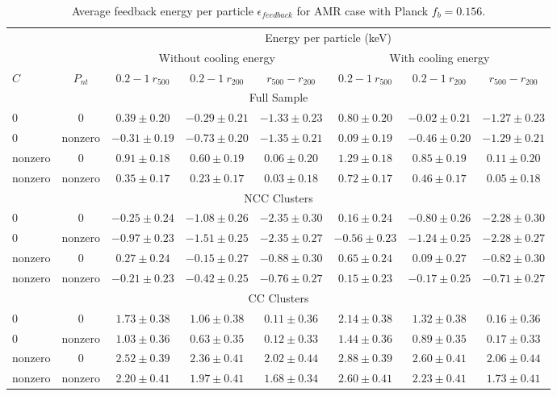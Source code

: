 \documentclass[a4paper,fleqn,usenatbib]{mnras}
\begin{document}
\begin{table*}
 \caption{Average feedback energy per particle $\epsilon_{feedback}$ for AMR case with Planck $f_{b}=0.156$.}
 \label{amrplanck}
 \begin{tabular}{@{}lccccccc}
  \hline
 &&\multicolumn{6}{c}{Energy per particle (keV) }\\
    \cline{3-8}
&&\multicolumn{3}{c}{Without cooling energy}&\multicolumn{3}{c}{With cooling energy}\\
\cline{3-8}
 $C$    &$P_{nt}$   & $0.2-1~r_{500}$ &   $0.2-1~r_{200}$& $r_{500}-r_{200}$&   $0.2-1~r_{500}$&$0.2-1~r_{200}$&$r_{500}-r_{200}$\\
  \hline
\multicolumn{8}{c}{Full Sample}\\
\hline
 0            &0          &$0.39\pm0.20$    &$-0.29\pm0.21$  &  $-1.33\pm0.23$  & $0.80\pm0.20$     &$-0.02\pm0.21$   & $-1.27\pm0.23$    \\
 0            & nonzero   & $-0.31\pm0.19$  &$-0.73\pm0.20$  &  $-1.35\pm0.21$  & $ 0.09\pm0.19$      &$-0.46\pm0.20$   &  $-1.29\pm0.21$     \\
nonzero       & 0         &$0.91\pm0.18$    &$0.60\pm0.19$  &  $0.06\pm0.20$  & $ 1.29\pm0.18$     &$0.85\pm0.19$   & $ 0.11\pm0.20$     \\
nonzero       & nonzero   & $ 0.35\pm0.17$  &$0.23\pm0.17$  &  $0.03\pm0.18$  & $0.72\pm0.17$      &$0.46\pm0.17$   &  $ 0.05\pm0.18$    \\
  \hline 
\multicolumn{8}{c}{NCC Clusters}\\
\hline
 0       &0          &$-0.25\pm0.24$    & $-1.08\pm0.26$  &  $-2.35\pm0.30$  &$0.16\pm0.24$      &$-0.80\pm0.26$    & $-2.28\pm0.30$  \\
 0       & nonzero   &$-0.97\pm0.23$   &$-1.51\pm0.25$   & $-2.35\pm0.27$   & $-0.56\pm0.23$    &$-1.24\pm0.25$    &  $-2.28\pm0.27$     \\
nonzero  & 0         &$0.27\pm0.24$    & $-0.15\pm0.27$  &  $-0.88\pm0.30$  &$0.65\pm0.24$      &$0.09\pm0.27$    & $-0.82\pm0.30$     \\
nonzero  & nonzero   &$-0.21\pm0.23$   &$-0.42\pm0.25$   & $-0.76\pm0.27$   & $0.15\pm0.23$    &$-0.17\pm0.25$    &  $-0.71\pm0.27$    \\
  \hline 
\multicolumn{8}{c}{CC Clusters}\\
\hline
 0        &0          &$1.73\pm0.38$    & $1.06\pm0.38$  &  $0.11\pm0.36$  & $2.14\pm0.38$  &$1.32\pm0.38$    & $  0.16\pm0.36$       \\
 0        & nonzero   & $1.03\pm0.36$   &$0.63\pm0.35$   & $0.12\pm0.33$   & $1.44\pm0.36$  &$ 0.89\pm0.35$    &   $ 0.17\pm0.33$     \\
nonzero   & 0         &$2.52\pm0.39$    & $2.36\pm0.41$  &  $2.02\pm0.44$  & $2.88\pm0.39$  &$2.60\pm0.41$    & $ 2.06\pm0.44$     \\
nonzero   & nonzero   & $2.20\pm0.41$   &$1.97\pm0.41$   & $1.68\pm0.34$   & $2.60\pm0.41$  &$2.23\pm0.41$    &   $1.73\pm0.41$    \\
  \hline 


\end{tabular}
\end{table*}
\end{document}
